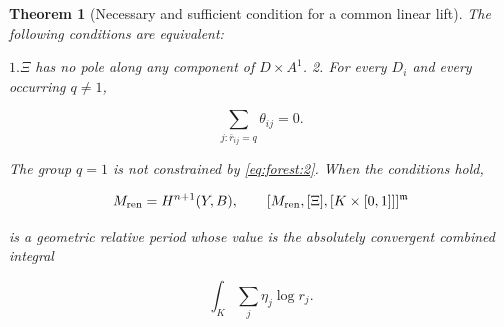 \documentclass[11pt,a4paper,oneside]{article}
\theoremstyle{plain}
\newtheorem{theorem}{Theorem}[section]
\theoremstyle{definition}
\theoremstyle{remark}
\numberwithin{equation}{section}
\begin{document}
\begin{theorem}[Necessary and sufficient condition for a common linear lift]

\label{thm:forest:1.1} The following conditions are equivalent:

\(1. \Xi \) has no pole along any component of \(D\times A^{1}\). 2. For every \(D_i\) and every occurring \(q\ne 1\),

\begin{equation}
\sum_{j:\bar r_{ij}=q}\theta_{ij}=0.          \label{eq:forest:2}
\end{equation}

The group \(q=1\) is not constrained by \eqref{eq:forest:2}. When the conditions hold,

\begin{equation}
M_{\rm ren}=H^{n+1}(Y,B),\qquad
 [M_{\rm ren},[\Xi],[K\times[0,1]]]^{\mathfrak m}                \label{eq:forest:3}
\end{equation}

is a geometric relative period whose value is the absolutely convergent combined integral

\begin{equation}
\int_K\sum_j\eta_j\log r_j.                                    \label{eq:forest:4}
\end{equation}

\end{theorem}
\end{document}
